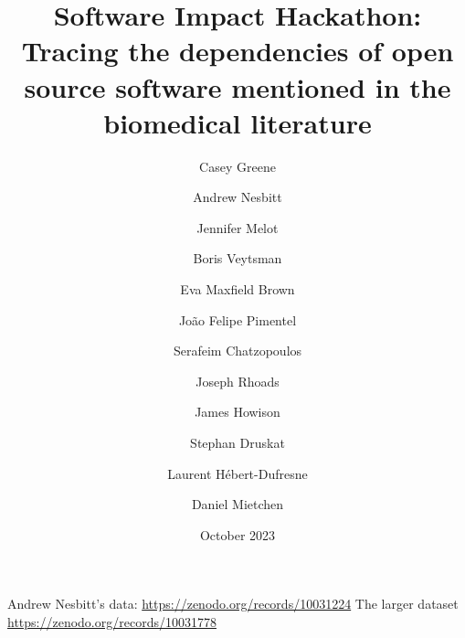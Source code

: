 \documentclass{article}
\title{Software Impact Hackathon:  Tracing the dependencies of open
  source software mentioned in the biomedical literature}
\date{October 2023}
\author{Casey Greene \and
Andrew Nesbitt \and
Jennifer Melot \and
Boris Veytsman \and
Eva Maxfield Brown \and
João Felipe Pimentel \and
Serafeim Chatzopoulos \and
Joseph Rhoads \and
James Howison \and
Stephan Druskat \and
Laurent H\'ebert-Dufresne \and
Daniel Mietchen}
\begin{document}
\maketitle

Andrew Nesbitt's data: \url{https://zenodo.org/records/10031224}
The larger dataset \url{https://zenodo.org/records/10031778} 
\end{document}
